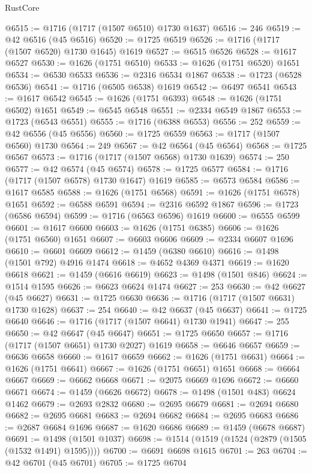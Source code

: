 \begin{lexlean}{RustCore}
\begin{coremodule}
@6515 := @1716 (@1717 (@1507 @6510) @1730 @1637)
@6516 := 246
@6519 := @42 @6516 (@45 @6516)
@6520 := @1725 @6519
@6526 := @1716 (@1717 (@1507 @6520) @1730 @1645) @1619
@6527 := @6515 @6526
@6528 := @1617 @6527
@6530 := @1626 (@1751 @6510)
@6533 := @1626 (@1751 @6520) @1651
@6534 := @6530 @6533
@6536 := @2316 @6534 @1867
@6538 := @1723 (@6528 @6536)
@6541 := @1716 (@6505 @6538) @1619
@6542 := @6497 @6541
@6543 := @1617 @6542
@6545 := @1626 (@1751 @6393)
@6548 := @1626 (@1751 @6502) @1651
@6549 := @6545 @6548
@6551 := @2334 @6549 @1867
@6553 := @1723 (@6543 @6551)
@6555 := @1716 (@6388 @6553)
@6556 := 252
@6559 := @42 @6556 (@45 @6556)
@6560 := @1725 @6559
@6563 := @1717 (@1507 @6560) @1730
@6564 := 249
@6567 := @42 @6564 (@45 @6564)
@6568 := @1725 @6567
@6573 := @1716 (@1717 (@1507 @6568) @1730 @1639)
@6574 := 250
@6577 := @42 @6574 (@45 @6574)
@6578 := @1725 @6577
@6584 := @1716 (@1717 (@1507 @6578) @1730 @1647) @1619
@6585 := @6573 @6584
@6586 := @1617 @6585
@6588 := @1626 (@1751 @6568)
@6591 := @1626 (@1751 @6578) @1651
@6592 := @6588 @6591
@6594 := @2316 @6592 @1867
@6596 := @1723 (@6586 @6594)
@6599 := @1716 (@6563 @6596) @1619
@6600 := @6555 @6599
@6601 := @1617 @6600
@6603 := @1626 (@1751 @6385)
@6606 := @1626 (@1751 @6560) @1651
@6607 := @6603 @6606
@6609 := @2334 @6607 @1696
@6610 := @6601 @6609
@6612 := @1459 (@6380 @6610)
@6616 := @1498 (@1501 @792) @4916 @1474
@6618 := @4652 @4369 @4371
@6619 := @1620 @6618
@6621 := @1459 (@6616 @6619)
@6623 := @1498 (@1501 @846)
@6624 := @1514 @1595
@6626 := @6623 @6624 @1474
@6627 := 253
@6630 := @42 @6627 (@45 @6627)
@6631 := @1725 @6630
@6636 := @1716 (@1717 (@1507 @6631) @1730 @1628)
@6637 := 254
@6640 := @42 @6637 (@45 @6637)
@6641 := @1725 @6640
@6646 := @1716 (@1717 (@1507 @6641) @1730 @1941)
@6647 := 255
@6650 := @42 @6647 (@45 @6647)
@6651 := @1725 @6650
@6657 := @1716 (@1717 (@1507 @6651) @1730 @2027) @1619
@6658 := @6646 @6657
@6659 := @6636 @6658
@6660 := @1617 @6659
@6662 := @1626 (@1751 @6631)
@6664 := @1626 (@1751 @6641)
@6667 := @1626 (@1751 @6651) @1651
@6668 := @6664 @6667
@6669 := @6662 @6668
@6671 := @2075 @6669 @1696
@6672 := @6660 @6671
@6674 := @1459 (@6626 @6672)
@6678 := @1498 (@1501 @483) @6624 @1462
@6679 := @2693 @2832
@6680 := @2695 @6679
@6681 := @2694 @6680
@6682 := @2695 @6681
@6683 := @2694 @6682
@6684 := @2695 @6683
@6686 := @2687 @6684 @1696
@6687 := @1620 @6686
@6689 := @1459 (@6678 @6687)
@6691 := @1498 (@1501 @1037)
@6698 := @1514 (@1519 (@1524 (@2879 (@1505 (@1532 @1491) @1595))))
@6700 := @6691 @6698 @1615
@6701 := 263
@6704 := @42 @6701 (@45 @6701)
@6705 := @1725 @6704

\end{coremodule}
\end{lexlean}
